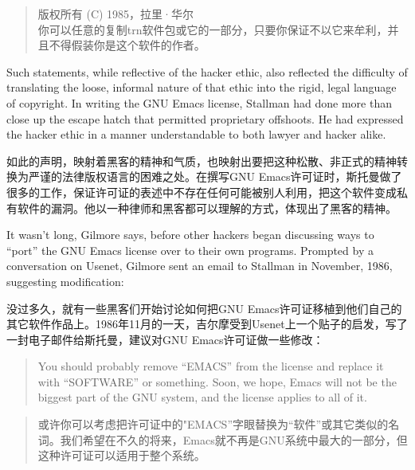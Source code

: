 \ifdefined\chs
\begin{quote}
版权所有 (C) 1985，拉里·华尔\\
你可以任意的复制trn软件包或它的一部分，只要你保证不以它来牟利，并且不得假装你是这个软件的作者。
\end{quote}
\fi

\ifdefined\eng
Such statements, while reflective of the hacker ethic, also reflected the difficulty of translating the loose, informal nature of that ethic into the rigid, legal language of copyright. In writing the GNU Emacs license, Stallman had done more than close up the escape hatch that permitted proprietary offshoots. He had expressed the hacker ethic in a manner understandable to both lawyer and hacker alike.
\fi

\ifdefined\chs
如此的声明，映射着黑客的精神和气质，也映射出要把这种松散、非正式的精神转换为严谨的法律版权语言的困难之处。在撰写GNU Emacs许可证时，斯托曼做了很多的工作，保证许可证的表述中不存在任何可能被别人利用，把这个软件变成私有软件的漏洞。他以一种律师和黑客都可以理解的方式，体现出了黑客的精神。
\fi

\ifdefined\eng
It wasn't long, Gilmore says, before other hackers began discussing ways to ``port'' the GNU Emacs license over to their own programs. Prompted by a conversation on Usenet, Gilmore sent an email to Stallman in November, 1986, suggesting modification:
\fi

\ifdefined\chs
没过多久，就有一些黑客们开始讨论如何把GNU Emacs许可证移植到他们自己的其它软件作品上。1986年11月的一天，吉尔摩受到Usenet上一个贴子的启发，写了一封电子邮件给斯托曼，建议对GNU Emacs许可证做一些修改：
\fi

\ifdefined\eng
\begin{quote}
You should probably remove ``EMACS'' from the license and replace it with ``SOFTWARE'' or something. Soon, we hope, Emacs will not be the biggest part of the GNU system, and the license applies to all of it.
\end{quote}
\fi

\ifdefined\chs
\begin{quote}
或许你可以考虑把许可证中的"EMACS”字眼替换为“软件”或其它类似的名词。我们希望在不久的将来，Emacs就不再是GNU系统中最大的一部分，但这种许可证可以适用于整个系统。 
\end{quote}
\fi

